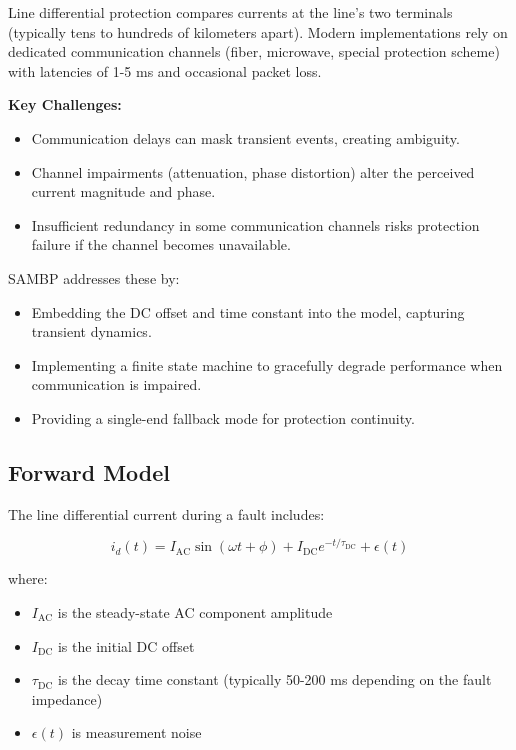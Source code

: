 \documentclass[12pt,a4paper]{article}
\newcommand{\key}[1]{\textbf{\textcolor{blue!70!black}{#1}}}
\begin{document}
Line differential protection compares currents at the line's two terminals (typically 
tens to hundreds of kilometers apart). Modern implementations rely on dedicated 
communication channels (fiber, microwave, special protection scheme)  with latencies 
of 1-5 ms and occasional packet loss.

\key{Key Challenges:}
\begin{itemize}
    \item Communication delays can mask transient events, creating ambiguity.
    \item Channel impairments (attenuation, phase distortion) alter the perceived 
    current magnitude and phase.
    \item Insufficient redundancy in some communication channels risks protection 
    failure if the channel becomes unavailable.
\end{itemize}

SAMBP addresses these by:
\begin{itemize}
    \item Embedding the DC offset and time constant into the model, capturing transient 
    dynamics.
    \item Implementing a finite state machine to gracefully degrade performance when 
    communication is impaired.
    \item Providing a single-end fallback mode for protection continuity.
\end{itemize}

\subsection{Forward Model}
\label{subsec:87l_model}

The line differential current during a fault includes:

\begin{equation}
i_d(t) = I_{\text{AC}} \sin(\omega t + \phi) + I_{\text{DC}} e^{-t/\tau_{\text{DC}}} + \epsilon(t)
\label{eq:87l_signal}
\end{equation}

where:
\begin{itemize}
    \item $I_{\text{AC}}$ is the steady-state AC component amplitude
    \item $I_{\text{DC}}$ is the initial DC offset
    \item $\tau_{\text{DC}}$ is the decay time constant (typically 50-200 ms depending 
    on the fault impedance)
    \item $\epsilon(t)$ is measurement noise
\end{itemize}
\end{document}
